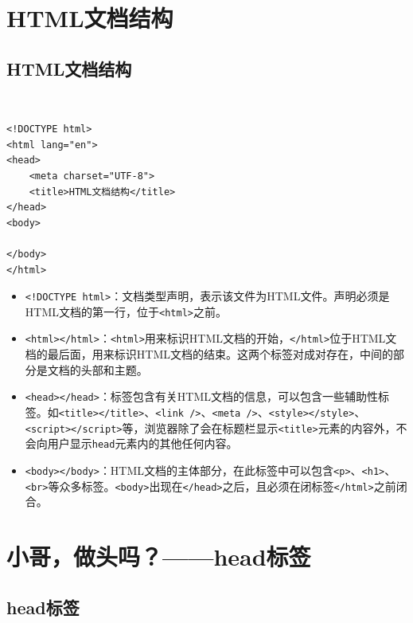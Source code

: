 \newpage

\section{HTML文档结构}

\subsection{HTML文档结构}

 \\
\begin{lstlisting}[style=htmlcssjs]
<!DOCTYPE html>
<html lang="en">
<head>
    <meta charset="UTF-8">
    <title>HTML文档结构</title>
</head>
<body>

</body>
</html>
\end{lstlisting}

\begin{itemize}
    \item \lstinline|<!DOCTYPE html>|：文档类型声明，表示该文件为HTML文件。声明必须是HTML文档的第一行，位于\lstinline|<html>|之前。

    \item \lstinline|<html></html>|：\lstinline|<html>|用来标识HTML文档的开始，\lstinline|</html>|位于HTML文档的最后面，用来标识HTML文档的结束。这两个标签对成对存在，中间的部分是文档的头部和主题。

    \item \lstinline|<head></head>|：标签包含有关HTML文档的信息，可以包含一些辅助性标签。如\lstinline|<title></title>|、\lstinline|<link />|、\lstinline|<meta />|、\lstinline|<style></style>|、\lstinline|<script></script>|等，浏览器除了会在标题栏显示\lstinline|<title>|元素的内容外，不会向用户显示\lstinline|head|元素内的其他任何内容。

    \item \lstinline|<body></body>|：HTML文档的主体部分，在此标签中可以包含\lstinline|<p>|、\lstinline|<h1>|、\lstinline|<br>|等众多标签。\lstinline|<body>|出现在\lstinline|</head>|之后，且必须在闭标签\lstinline|</html>|之前闭合。
\end{itemize}

\newpage

\section{小哥，做头吗？——head标签}

\subsection{head标签}

